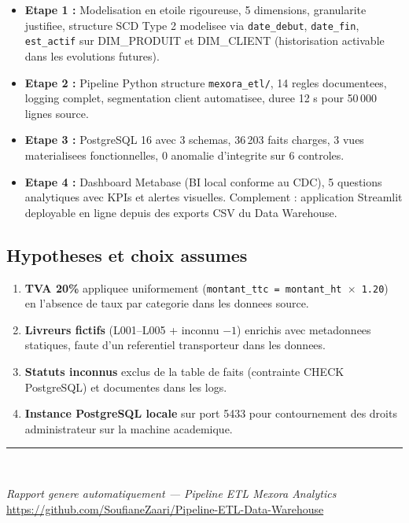 \documentclass[12pt,a4paper]{article}
\begin{document}
\begin{infobox}[title=Bilan technique]
\begin{itemize}[leftmargin=*]
  \item \textbf{Etape 1 :} Modelisation en etoile rigoureuse, 5 dimensions, granularite justifiee,
    structure SCD Type 2 modelisee via \texttt{date\_debut}, \texttt{date\_fin},
    \texttt{est\_actif} sur DIM\_PRODUIT et DIM\_CLIENT (historisation activable
    dans les evolutions futures).
  \item \textbf{Etape 2 :} Pipeline Python structure \texttt{mexora\_etl/}, 14 regles documentees,
    logging complet, segmentation client automatisee, duree 12 s pour 50\,000 lignes source.
  \item \textbf{Etape 3 :} PostgreSQL 16 avec 3 schemas, 36\,203 faits charges, 3 vues
    materialisees fonctionnelles, 0 anomalie d'integrite sur 6 controles.
  \item \textbf{Etape 4 :} Dashboard Metabase (BI local conforme au CDC), 5 questions
    analytiques avec KPIs et alertes visuelles. Complement : application Streamlit
    deployable en ligne depuis des exports CSV du Data Warehouse.
\end{itemize}
\end{infobox}

\subsection*{Hypotheses et choix assumes}

\begin{enumerate}[leftmargin=*]
  \item \textbf{TVA 20\%} appliquee uniformement (\texttt{montant\_ttc = montant\_ht $\times$ 1.20})
    en l'absence de taux par categorie dans les donnees source.
  \item \textbf{Livreurs fictifs} (L001--L005 + inconnu $-1$) enrichis avec metadonnees statiques,
    faute d'un referentiel transporteur dans les donnees.
  \item \textbf{Statuts inconnus} exclus de la table de faits (contrainte CHECK PostgreSQL) et
    documentes dans les logs.
  \item \textbf{Instance PostgreSQL locale} sur port 5433 pour contournement des droits
    administrateur sur la machine academique.
\end{enumerate}

\vspace{1cm}
{\color{mexblue}\rule{\linewidth}{2pt}}\\[0.3cm]
\begin{center}
\textit{Rapport genere automatiquement --- Pipeline ETL Mexora Analytics}\\
\url{https://github.com/SoufianeZaari/Pipeline-ETL-Data-Warehouse}
\end{center}
\end{document}
